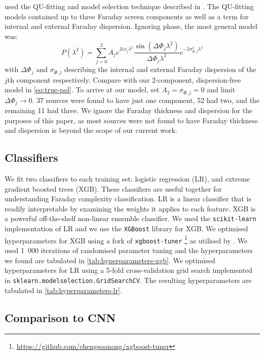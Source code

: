     \citet{osullivan_broad-band_2017} used the QU-fitting and model selection technique described in \citet{osullivan12agn}. The QU-fitting models contained up to three Faraday screen components as well as a term for internal and external Faraday dispersion. Ignoring phase, the most general model was:
    \begin{equation}
      P(\lambda^2) = \sum_{j = 0}^2 A_j e^{2i \phi_j \lambda^2} \frac{\sin (\Delta \Phi_j \lambda^2)}{\Delta \Phi_j \lambda^2} e^{-2\sigma_{\Phi,j}^2 \lambda^4}
    \end{equation}
    with $\Delta \Phi_j$ and $\sigma_{\Phi,j}$ describing the internal and external Faraday dispersion of the $j$th component respectively. Compare with our 2-component, dispersion-free model in \autoref{eq:true-pol}. To arrive at our model, set $A_2 = \sigma_{\Phi,j} = 0$ and limit $\Delta \Phi_j \to 0$. 37 sources were found to have just one component, 52 had two, and the remaining 11 had three. We ignore the Faraday thickness and dispersion for the purposes of this paper, as most sources were not found to have Faraday thickness and dispersion is beyond the scope of our current work.

  \subsection{Classifiers}
  \label{sec:faraday-classifiers}

    We fit two classifiers to each training set: logistic regression (LR), and extreme gradient boosted trees (XGB). These classifiers are useful together for understanding Faraday complexity classification. LR is a linear classifier that is readily interpretable by examining the weights it applies to each feature. XGB is a powerful off-the-shelf non-linear ensemble classifier. We used the \texttt{scikit-learn} implementation of LR and we use the \texttt{XGBoost} library for XGB. We optimised hyperparameters for XGB using a fork of \texttt{xgboost-tuner} \footnote{\url{https://github.com/chengsoonong/xgboost-tuner}} as utilised by \citet{zhu20mutagenic}. We used 1~000 iterations of randomised parameter tuning and the hyperparameters we found are tabulated in \autoref{tab:hyperparameters-xgb}.
    We optimised hyperparameters for LR using a 5-fold cross-validation grid search implemented in \texttt{sklearn.model\textunderscore{}selection.GridSearchCV}. The resulting hyperparameters are tabulated in \autoref{tab:hyperparameters-lr}.

  \subsection{Comparison to CNN}
  \label{sec:faraday-cnn-comparison}

